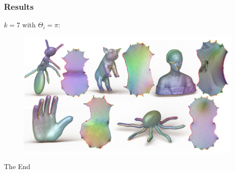 \documentclass{beamer}
\begin{document}
\begin{frame}
\frametitle{Results}
$k = 7$ with $\Theta_i = \pi$:
\begin{figure}
\includegraphics[width = \textwidth]{images/hyperbolic-result}
\end{figure}
\end{frame}




\begin{frame}
\Huge{\centerline{The End}}
\end{frame}

\end{document}
